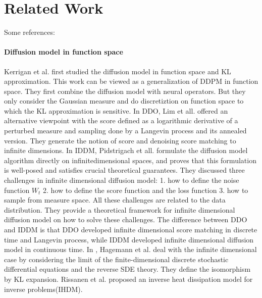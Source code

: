 \documentclass{article}
\begin{document}
\section{Related Work}
Some references: \cite{whittle1954stationary, carrizo2022general, lindgren2020diffusion, sigrist2015stochastic, bolin2020rational, Porcu2023}

\cite{dupont2022generativemodelsdistributionsfunctions}
\cite{mittal2022pointsfunctionsinfinitedimensionalrepresentations}

\paragraph{Diffusion model in function space}
Kerrigan et al. \cite{kerrigan2023diffusiongenerativemodelsinfinite} first studied the diffusion model in function space and KL approximation. 
This work can be viewed as a generalization of DDPM in function space. They first combine the diffusion model with neural operators.
But they only consider the Gaussian measure and do discretiztion on function space to which the KL approximation is sensitive.
In DDO\cite{lim2025scorebaseddiffusionmodelsfunction}, Lim et all. offered an alternative viewpoint with the score defined as a logarithmic derivative of a perturbed measure and sampling done by a Langevin process and its annealed version.
They generate the notion of score and denoising score matching to infinite dimensions.
In IDDM\cite{JMLR:v25:23-1271}, Pidstrigach et all. formulate the diffusion model algorithm directly on infinitedimensional spaces, and proves that this formulation is well-posed and satisfies crucial theoretical guarantees.
They discussed three challenges in infinite dimensional diffusion model: 1. how to define the noise function $W_t$ 2. how to define the score function and the loss function 3. how to sample from measure space.
All these challenges are related to the data distribution. They provide a theoretical framework for infinite dimensional diffusion model on how to solve these challenges.
The difference between DDO and IDDM is that DDO developed infinite dimensional score matching in discrete time and Langevin process, while IDDM developed infinite dimensional diffusion model in continuous time.
In \cite{hagemann2024multileveldiffusioninfinitedimensional}, Hagemann et al. deal with the infinite dimensional case by considering the limit of the finite-dimensional discrete stochastic differential equations and the reverse SDE theory.
They define the isomorphism by KL expansion.
Rissanen et al.\cite{rissanen2023generativemodellinginverseheat} proposed an inverse heat dissipation model for inverse problems(IHDM).
\end{document}
